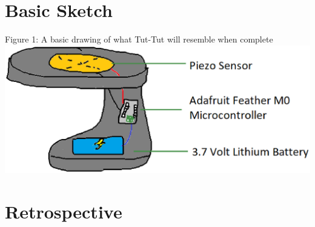 \documentclass[letterpaper,10pt,draftclsnofoot,onecolumn]{article}
\begin{document}
\section*{Basic Sketch}
\begin{center}
Figure 1: A basic drawing of what Tut-Tut will resemble when complete
\includegraphics[width=.8\textwidth]{TutTutFirstDraft.eps}
\end{center}

\section{Retrospective}
\end{document}
